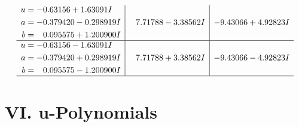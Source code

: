 \documentclass[1p]{elsarticle_modified}
\theoremstyle{definition}
\begin{document}
$$\begin{array}{c|c|c}
\begin{aligned}
u &= -0.63156 + 1.63091 I \\
a &= -0.379420 - 0.298919 I \\
b &= \phantom{-}0.095575 + 1.200900 I\end{aligned}
 & \phantom{-}7.71788 - 3.38562 I & -9.43066 + 4.92823 I \\ \hline\begin{aligned}
u &= -0.63156 - 1.63091 I \\
a &= -0.379420 + 0.298919 I \\
b &= \phantom{-}0.095575 - 1.200900 I\end{aligned}
 & \phantom{-}7.71788 + 3.38562 I & -9.43066 - 4.92823 I\\
 \hline 
 \end{array}$$\newpage
\newpage\renewcommand{\arraystretch}{1}
\centering \section*{ VI. u-Polynomials}
\end{document}
